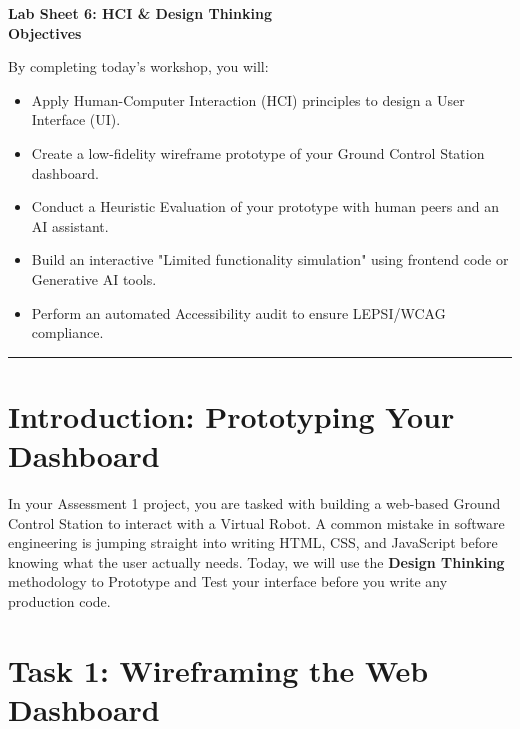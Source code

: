 \documentclass[a4paper,12pt]{article}
\begin{document}

\begin{center}
    \LARGE \textbf{Lab Sheet 6: HCI \& Design Thinking} \\
    \vspace{0.5cm}
    \large \textbf{Objectives}
\end{center}

\noindent By completing today's workshop, you will:
\begin{itemize}
    \item Apply Human-Computer Interaction (HCI) principles to design a User Interface (UI).
    \item Create a low-fidelity wireframe prototype of your Ground Control Station dashboard.
    \item Conduct a Heuristic Evaluation of your prototype with human peers and an AI assistant.
    \item Build an interactive "Limited functionality simulation" using frontend code or Generative AI tools.
    \item Perform an automated Accessibility audit to ensure LEPSI/WCAG compliance.
\end{itemize}

\vspace{0.5cm}
\hrule
\vspace{0.5cm}

\section*{Introduction: Prototyping Your Dashboard}
In your Assessment 1 project, you are tasked with building a web-based Ground Control Station to interact with a Virtual Robot. A common mistake in software engineering is jumping straight into writing HTML, CSS, and JavaScript before knowing what the user actually needs. Today, we will use the \textbf{Design Thinking} methodology to Prototype and Test your interface before you write any production code.


\section*{Task 1: Wireframing the Web Dashboard}
\end{document}
